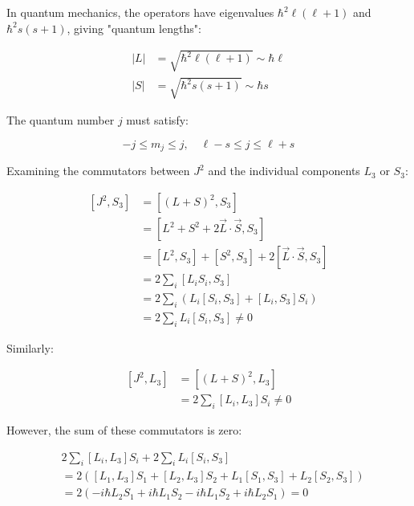 \documentclass[italian]{HKNdocument}
\begin{document}
In quantum mechanics, the operators have eigenvalues $\hbar^{2}\ell(\ell+1)$ and $\hbar^{2}s(s+1)$, giving "quantum lengths":

\begin{align}
|L| &= \sqrt{\hbar^{2} \ell(\ell+1)} \sim \hbar \ell  \\
|S| &= \sqrt{\hbar^{2} s(s+1)} \sim \hbar s
\end{align}

The quantum number $j$ must satisfy:

\begin{equation}
-j \leq m_{j} \leq j, \quad \ell-s \leq j \leq \ell+s
\end{equation}

Examining the commutators between $J^2$ and the individual components $L_3$ or $S_3$:

\begin{align}
\left[J^{2}, S_{3}\right] &= \left[(L+S)^{2}, S_{3}\right]\\
&= \left[L^{2}+S^{2}+2 \vec{L} \cdot \vec{S}, S_{3}\right]\\
&= \left[L^{2}, S_{3}\right]+\left[S^{2}, S_{3}\right]+2\left[\vec{L} \cdot \vec{S}, S_{3}\right]\\
&= 2 \sum_{i}\left[L_{i} S_{i}, S_{3}\right]\\
&= 2 \sum_{i}\left(L_{i}\left[S_{i}, S_{3}\right]+\left[L_{i}, S_{3}\right] S_{i}\right)\\
&= 2 \sum_{i} L_{i}\left[S_{i}, S_{3}\right] \neq 0
\end{align}

Similarly:

\begin{align}
\left[J^{2}, L_{3}\right] &= \left[(L+S)^{2}, L_{3}\right]\\
&= 2 \sum_{i}\left[L_{i}, L_{3}\right] S_{i} \neq 0
\end{align}

However, the sum of these commutators is zero:

\begin{align}
&2 \sum_{i}\left[L_{i}, L_{3}\right] S_{i}+2 \sum_{i} L_{i}\left[S_{i}, S_{3}\right]\\
&= 2\left(\left[L_{1}, L_{3}\right] S_{1}+\left[L_{2}, L_{3}\right] S_{2}+L_{1}\left[S_{1}, S_{3}\right]+L_{2}\left[S_{2}, S_{3}\right]\right)\\
&= 2\left(-i \hbar L_{2} S_{1}+i \hbar L_{1} S_{2}-i \hbar L_{1} S_{2}+i \hbar L_{2} S_{1}\right)=0
\end{align}
\end{document}
